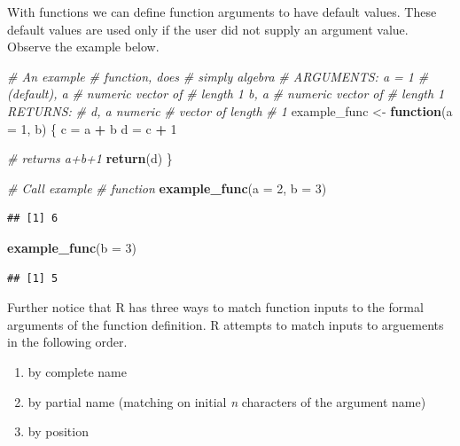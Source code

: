 \documentclass[
]{book}
\newenvironment{Shaded}{\begin{snugshade}}{\end{snugshade}}
\newcommand{\CommentTok}[1]{\textcolor[rgb]{0.56,0.35,0.01}{\textit{#1}}}
\newcommand{\ControlFlowTok}[1]{\textcolor[rgb]{0.13,0.29,0.53}{\textbf{#1}}}
\newcommand{\DataTypeTok}[1]{\textcolor[rgb]{0.13,0.29,0.53}{#1}}
\newcommand{\DecValTok}[1]{\textcolor[rgb]{0.00,0.00,0.81}{#1}}
\newcommand{\KeywordTok}[1]{\textcolor[rgb]{0.13,0.29,0.53}{\textbf{#1}}}
\newcommand{\NormalTok}[1]{#1}
\newcommand{\OperatorTok}[1]{\textcolor[rgb]{0.81,0.36,0.00}{\textbf{#1}}}
\newcommand{\StringTok}[1]{\textcolor[rgb]{0.31,0.60,0.02}{#1}}
\begin{document}
With functions we can define function arguments to have default values. These default values are used only if the user did not supply an argument value. Observe the example below.

\begin{Shaded}
\begin{Highlighting}[]
\CommentTok{# An example}
\CommentTok{# function, does}
\CommentTok{# simply algebra}
\CommentTok{# ARGUMENTS: a = 1}
\CommentTok{# (default), a}
\CommentTok{# numeric vector of}
\CommentTok{# length 1 b, a}
\CommentTok{# numeric vector of}
\CommentTok{# length 1 RETURNS:}
\CommentTok{# d, a numeric}
\CommentTok{# vector of length}
\CommentTok{# 1}
\NormalTok{example_func <-}\StringTok{ }\ControlFlowTok{function}\NormalTok{(}\DataTypeTok{a =} \DecValTok{1}\NormalTok{,}
\NormalTok{    b) \{}
\NormalTok{    c =}\StringTok{ }\NormalTok{a }\OperatorTok{+}\StringTok{ }\NormalTok{b}
\NormalTok{    d =}\StringTok{ }\NormalTok{c }\OperatorTok{+}\StringTok{ }\DecValTok{1}

    \CommentTok{# returns a+b+1}
    \KeywordTok{return}\NormalTok{(d)}
\NormalTok{\}}

\CommentTok{# Call example}
\CommentTok{# function}
\KeywordTok{example_func}\NormalTok{(}\DataTypeTok{a =} \DecValTok{2}\NormalTok{, }\DataTypeTok{b =} \DecValTok{3}\NormalTok{)}
\end{Highlighting}
\end{Shaded}

\begin{verbatim}
## [1] 6
\end{verbatim}

\begin{Shaded}
\begin{Highlighting}[]
\KeywordTok{example_func}\NormalTok{(}\DataTypeTok{b =} \DecValTok{3}\NormalTok{)}
\end{Highlighting}
\end{Shaded}

\begin{verbatim}
## [1] 5
\end{verbatim}

Further notice that R has three ways to match function inputs to the formal arguments of the function definition. R attempts to match inputs to arguements in the following order.

\begin{enumerate}
\def\labelenumi{\arabic{enumi})}
\item
  by complete name
\item
  by partial name (matching on initial \emph{n} characters of the argument name)
\item
  by position
\end{enumerate}
\end{document}
